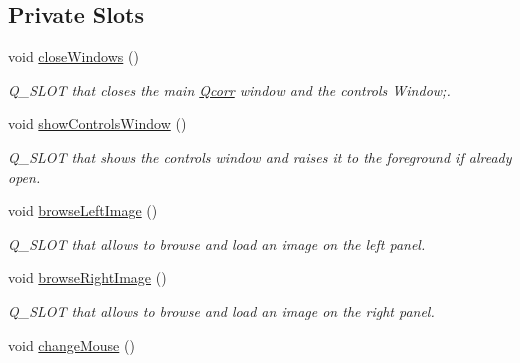 \subsection*{Private Slots}
\begin{CompactItemize}
\item 
\hypertarget{classQcorr_395de1dc21d85fa766fb6558c5e302e5}{
void \hyperlink{classQcorr_395de1dc21d85fa766fb6558c5e302e5}{closeWindows} ()}
\label{classQcorr_395de1dc21d85fa766fb6558c5e302e5}

\begin{CompactList}\small\item\em Q\_\-SLOT that closes the main \hyperlink{classQcorr}{Qcorr} window and the controls Window;. \item\end{CompactList}\item 
\hypertarget{classQcorr_01b57fcc6bedf40f5c175c3fb4667a94}{
void \hyperlink{classQcorr_01b57fcc6bedf40f5c175c3fb4667a94}{showControlsWindow} ()}
\label{classQcorr_01b57fcc6bedf40f5c175c3fb4667a94}

\begin{CompactList}\small\item\em Q\_\-SLOT that shows the controls window and raises it to the foreground if already open. \item\end{CompactList}\item 
\hypertarget{classQcorr_db32e7bfe6afb84f306a9eb5bcd9b322}{
void \hyperlink{classQcorr_db32e7bfe6afb84f306a9eb5bcd9b322}{browseLeftImage} ()}
\label{classQcorr_db32e7bfe6afb84f306a9eb5bcd9b322}

\begin{CompactList}\small\item\em Q\_\-SLOT that allows to browse and load an image on the left panel. \item\end{CompactList}\item 
\hypertarget{classQcorr_60583105115d8d14c5fa2a959dc0f285}{
void \hyperlink{classQcorr_60583105115d8d14c5fa2a959dc0f285}{browseRightImage} ()}
\label{classQcorr_60583105115d8d14c5fa2a959dc0f285}

\begin{CompactList}\small\item\em Q\_\-SLOT that allows to browse and load an image on the right panel. \item\end{CompactList}\item 
\hypertarget{classQcorr_3f27a3e9b548f80998a0266c9c4165a8}{
void \hyperlink{classQcorr_3f27a3e9b548f80998a0266c9c4165a8}{changeMouse} ()}
\label{classQcorr_3f27a3e9b548f80998a0266c9c4165a8}


\end{CompactItemize}
